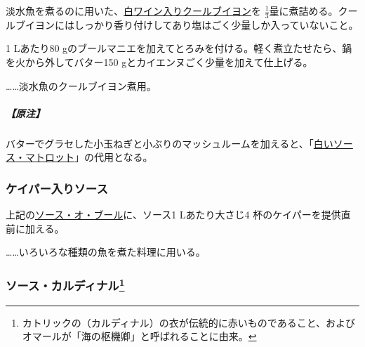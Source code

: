 \begin{recette}
淡水魚を煮るのに用いた、\protect\hyperlink{court-bouillon-b}{白ワイン入りクールブイヨン}を
\(\frac{1}{3}\)量に煮詰める。クールブイヨンにはしっかり香り付けしてあり塩はごく少量しか入っていないこと。

1 Lあたり80
gのブールマニエを加えてとろみを付ける。軽く煮立たせたら、鍋を火から外してバター150
gとカイエンヌごく少量を加えて仕上げる。

\ldots{}\ldots{}淡水魚のクールブイヨン煮用。

\hypertarget{nota-sauce-canotiere}{%
\subparagraph{【原注】}\label{nota-sauce-canotiere}}

バターでグラセした小玉ねぎと小ぶりのマッシュルームを加えると、「\protect\hyperlink{sauce-matelote-blanche}{白いソース・マトロット}」の代用となる。

\hypertarget{sauce-aux-capres}{%
\subsubsection{ケイパー入りソース}\label{sauce-aux-capres}}



上記の\protect\hyperlink{sauce-au-beurre}{ソース・オ・ブール}に、ソース1
Lあたり大さじ4 杯のケイパーを提供直前に加える。

\ldots{}\ldots{}いろいろな種類の魚を煮た料理に用いる。

\hypertarget{sauce-cardinal}{%
\subsubsection[ソース・カルディナル]{\texorpdfstring{ソース・カルディナル\footnote{カトリックの（カルディナル）の衣が伝統的に赤いものであること、およびオマールが「海の枢機卿」と呼ばれることに由来。}}{ソース・カルディナル}}\label{sauce-cardinal}}




\end{recette}
